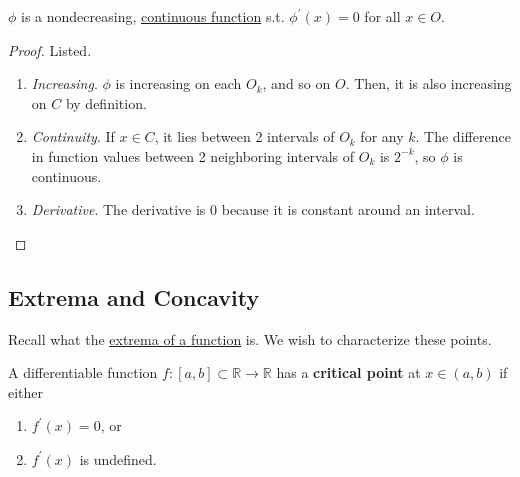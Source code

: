   \begin{theorem}
    \label{thm:properties-of-cantor-lebesgue-function}
    $\phi$ is a nondecreasing, \hyperref[pst-def:continuous_func]{continuous function} s.t. $\phi^\prime (x) = 0$ for all $x \in O$. 
  \end{theorem}
  \begin{proof}
    Listed. 
    \begin{enumerate}
      \item \textit{Increasing}. $\phi$ is increasing on each $O_k$, and so on $O$. Then, it is also increasing on $C$ by definition. 
      \item \textit{Continuity}. If $x \in C$, it lies between 2 intervals of $O_k$ for any $k$. The difference in function values between 2 neighboring intervals of $O_k$ is $2^{-k}$, so $\phi$ is continuous. 
      \item \textit{Derivative}. The derivative is $0$ because it is constant around an interval. 
    \end{enumerate}
  \end{proof}

\subsection{Extrema and Concavity}

	Recall what the \hyperref[st-def:extrema_functions]{extrema of a function} is. We wish to characterize these points. 

	\begin{definition}
	  \label{def:critical-point}
		A differentiable function $f: [a, b] \subset \mathbb{R} \to \mathbb{R}$ has a \textbf{critical point} at $x \in (a, b)$ if either 
		\begin{enumerate}
		  \item $f^\prime (x) = 0$, or 
			\item $f^\prime (x)$ is undefined. 
		\end{enumerate}
	\end{definition}

